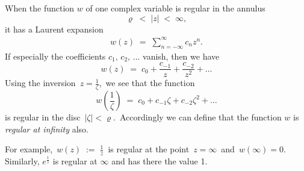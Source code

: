 \documentclass[12pt]{article}
\theoremstyle{definition}
\begin{document}
When the function $w$ of one complex variable is regular in the annulus
               $$\varrho \;<\; |z| \;<\; \infty,$$
it has a Laurent expansion
\begin{align}
  w(z) \;=\; \sum_{n=-\infty}^{\infty}c_nz^n.
\end{align}
If especially the coefficients $c_1,\, c_2,\,\ldots$ vanish, then we have
   $$w(z) \;=\; c_0+\frac{c_{-1}}{z}+\frac{c_{-2}}{z^2}+\ldots$$
Using the inversion \,$z = \frac{1}{\zeta}$,\, we see that the function
     $$w\!\left(\frac{1}{\zeta}\right) \;=\; c_0+c_{-1}\zeta+c_{-2}\zeta^2+\ldots$$
is regular in the disc \,$|\zeta| < \varrho$.\, Accordingly we can define that the function $w$ is {\em regular at infinity} also.

For example,\, $\displaystyle w(z) \;:=\; \frac{1}{z}$\, is regular at the point \,$z = \infty$\, and\, $w(\infty) = 0$.\, Similarly, $e^{\frac{1}{z}}$ is regular at $\infty$ and has there the value 1.

\end{document}
